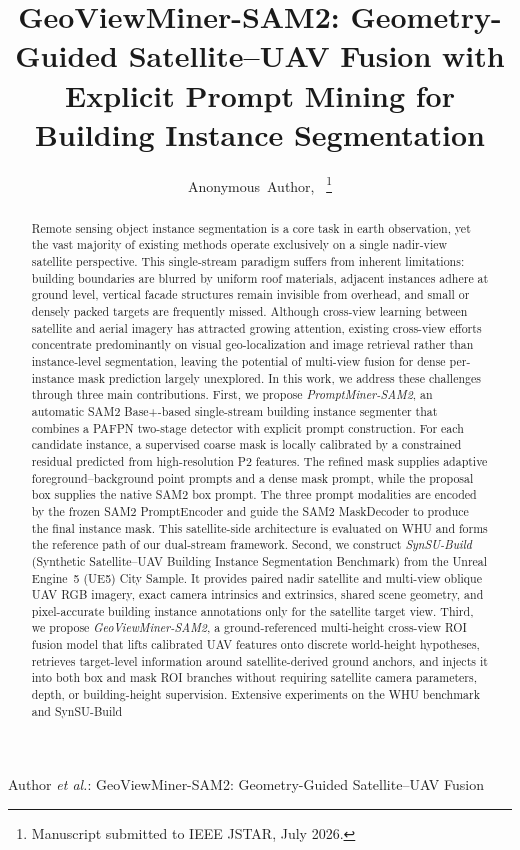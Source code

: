 \documentclass[letterpaper,journal]{IEEEtran}
\begin{document}
\title{GeoViewMiner-SAM2: Geometry-Guided Satellite--UAV Fusion with Explicit Prompt Mining for Building Instance Segmentation}

\author{Anonymous~Author,~
\thanks{Manuscript submitted to IEEE JSTAR, July 2026.}}

%
{Author \MakeLowercase{\textit{et al.}}: GeoViewMiner-SAM2: Geometry-Guided Satellite--UAV Fusion}

\maketitle

\begin{abstract}
Remote sensing object instance segmentation is a core task in earth observation, yet the vast majority of existing methods operate exclusively on a single nadir-view satellite perspective. This single-stream paradigm suffers from inherent limitations: building boundaries are blurred by uniform roof materials, adjacent instances adhere at ground level, vertical facade structures remain invisible from overhead, and small or densely packed targets are frequently missed. Although cross-view learning between satellite and aerial imagery has attracted growing attention, existing cross-view efforts concentrate predominantly on visual geo-localization and image retrieval rather than instance-level segmentation, leaving the potential of multi-view fusion for dense per-instance mask prediction largely unexplored. In this work, we address these challenges through three main contributions. First, we propose \emph{PromptMiner-SAM2}, an automatic SAM2 Base+-based single-stream building instance segmenter that combines a PAFPN two-stage detector with explicit prompt construction. For each candidate instance, a supervised coarse mask is locally calibrated by a constrained residual predicted from high-resolution P2 features. The refined mask supplies adaptive foreground--background point prompts and a dense mask prompt, while the proposal box supplies the native SAM2 box prompt. The three prompt modalities are encoded by the frozen SAM2 PromptEncoder and guide the SAM2 MaskDecoder to produce the final instance mask. This satellite-side architecture is evaluated on WHU and forms the reference path of our dual-stream framework. Second, we construct \emph{SynSU-Build} (Synthetic Satellite--UAV Building Instance Segmentation Benchmark) from the Unreal Engine~5 (UE5) City Sample. It provides paired nadir satellite and multi-view oblique UAV RGB imagery, exact camera intrinsics and extrinsics, shared scene geometry, and pixel-accurate building instance annotations only for the satellite target view. Third, we propose \emph{GeoViewMiner-SAM2}, a ground-referenced multi-height cross-view ROI fusion model that lifts calibrated UAV features onto discrete world-height hypotheses, retrieves target-level information around satellite-derived ground anchors, and injects it into both box and mask ROI branches without requiring satellite camera parameters, depth, or building-height supervision. Extensive experiments on the WHU benchmark and SynSU-Build 
\end{abstract}
\end{document}
